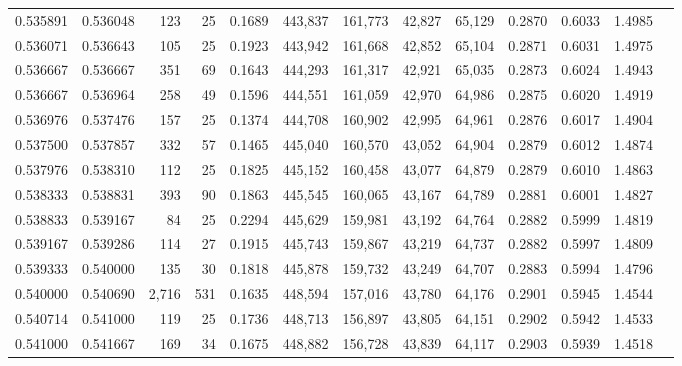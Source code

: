 \begin{tabular}{rrrrrrrrrrrrr}
0.535891 & 0.536048 &   123 &  25 &                                     0.1689 & 443,837 & 161,773 &  42,827 &  65,129 & 0.2870 & 0.6033 & 1.4985 \\
0.536071 & 0.536643 &   105 &  25 &                                     0.1923 & 443,942 & 161,668 &  42,852 &  65,104 & 0.2871 & 0.6031 & 1.4975 \\
0.536667 & 0.536667 &   351 &  69 &                                     0.1643 & 444,293 & 161,317 &  42,921 &  65,035 & 0.2873 & 0.6024 & 1.4943 \\
0.536667 & 0.536964 &   258 &  49 &                                     0.1596 & 444,551 & 161,059 &  42,970 &  64,986 & 0.2875 & 0.6020 & 1.4919 \\
0.536976 & 0.537476 &   157 &  25 &                                     0.1374 & 444,708 & 160,902 &  42,995 &  64,961 & 0.2876 & 0.6017 & 1.4904 \\
0.537500 & 0.537857 &   332 &  57 &                                     0.1465 & 445,040 & 160,570 &  43,052 &  64,904 & 0.2879 & 0.6012 & 1.4874 \\
0.537976 & 0.538310 &   112 &  25 &                                     0.1825 & 445,152 & 160,458 &  43,077 &  64,879 & 0.2879 & 0.6010 & 1.4863 \\
0.538333 & 0.538831 &   393 &  90 &                                     0.1863 & 445,545 & 160,065 &  43,167 &  64,789 & 0.2881 & 0.6001 & 1.4827 \\
0.538833 & 0.539167 &    84 &  25 &                                     0.2294 & 445,629 & 159,981 &  43,192 &  64,764 & 0.2882 & 0.5999 & 1.4819 \\
0.539167 & 0.539286 &   114 &  27 &                                     0.1915 & 445,743 & 159,867 &  43,219 &  64,737 & 0.2882 & 0.5997 & 1.4809 \\
0.539333 & 0.540000 &   135 &  30 &                                     0.1818 & 445,878 & 159,732 &  43,249 &  64,707 & 0.2883 & 0.5994 & 1.4796 \\
0.540000 & 0.540690 & 2,716 & 531 &                                     0.1635 & 448,594 & 157,016 &  43,780 &  64,176 & 0.2901 & 0.5945 & 1.4544 \\
0.540714 & 0.541000 &   119 &  25 &                                     0.1736 & 448,713 & 156,897 &  43,805 &  64,151 & 0.2902 & 0.5942 & 1.4533 \\
0.541000 & 0.541667 &   169 &  34 &                                     0.1675 & 448,882 & 156,728 &  43,839 &  64,117 & 0.2903 & 0.5939 & 1.4518 \\

\end{tabular}
